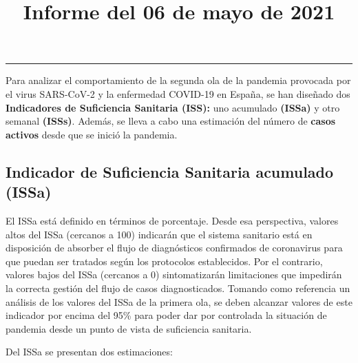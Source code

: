 \documentclass[
  11pt,
]{article}
\title{Informe del 06 de mayo de 2021}
\author{}
\date{\vspace{-2.5em}}
\begin{document}
\maketitle

\renewcommand{\figurename}{Figura}
\renewcommand{\tablename}{Tabla}

\tableofcontents

\vspace{.5cm}

\begin{center}\rule{0.5\linewidth}{0.5pt}\end{center}

\vspace{.5cm}

Para analizar el comportamiento de la segunda ola de la pandemia
provocada por el virus SARS-CoV-2 y la enfermedad COVID-19 en España, se
han diseñado dos \textbf{Indicadores de Suficiencia Sanitaria (ISS):}
uno acumulado \textbf{(ISSa)} y otro semanal \textbf{(ISSs)}. Además, se
lleva a cabo una estimación del número de \textbf{casos activos} desde
que se inició la pandemia.

\hypertarget{indicador-de-suficiencia-sanitaria-acumulado-issa}{%
\subsection{Indicador de Suficiencia Sanitaria acumulado
(ISSa)}\label{indicador-de-suficiencia-sanitaria-acumulado-issa}}

El ISSa está definido en términos de porcentaje. Desde esa perspectiva,
valores altos del ISSa (cercanos a 100) indicarán que el sistema
sanitario está en disposición de absorber el flujo de diagnósticos
confirmados de coronavirus para que puedan ser tratados según los
protocolos establecidos. Por el contrario, valores bajos del ISSa
(cercanos a 0) sintomatizarán limitaciones que impedirán la correcta
gestión del flujo de casos diagnosticados. Tomando como referencia un
análisis de los valores del ISSa de la primera ola, se deben alcanzar
valores de este indicador por encima del 95\% para poder dar por
controlada la situación de pandemia desde un punto de vista de
suficiencia sanitaria.

Del ISSa se presentan dos estimaciones:
\end{document}
